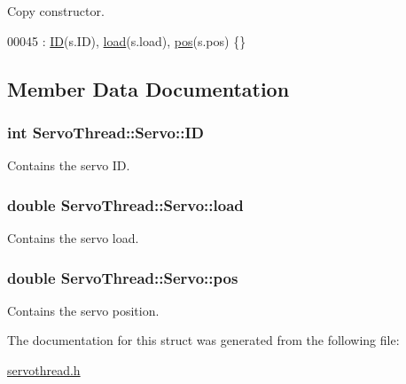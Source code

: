 Copy constructor. 


\begin{DoxyCode}
00045 : \hyperlink{struct_servo_thread_1_1_servo_a06b514c42113aa85fd1703fc88fca7ce}{ID}(s.ID), \hyperlink{struct_servo_thread_1_1_servo_ae378d77acf16b306649c87fdb8df677e}{load}(s.load), \hyperlink{struct_servo_thread_1_1_servo_a9fa0aa56944b9b0bb9d66303d5bd4b59}{pos}(s.pos) \{\}
\end{DoxyCode}


\subsection{Member Data Documentation}
\hypertarget{struct_servo_thread_1_1_servo_a06b514c42113aa85fd1703fc88fca7ce}{}
\subsubsection[{I\+D}]{\setlength{\rightskip}{0pt plus 5cm}int Servo\+Thread\+::\+Servo\+::\+I\+D}\label{struct_servo_thread_1_1_servo_a06b514c42113aa85fd1703fc88fca7ce}


Contains the servo I\+D. 

\hypertarget{struct_servo_thread_1_1_servo_ae378d77acf16b306649c87fdb8df677e}{}
\subsubsection[{load}]{\setlength{\rightskip}{0pt plus 5cm}double Servo\+Thread\+::\+Servo\+::load}\label{struct_servo_thread_1_1_servo_ae378d77acf16b306649c87fdb8df677e}


Contains the servo load. 

\hypertarget{struct_servo_thread_1_1_servo_a9fa0aa56944b9b0bb9d66303d5bd4b59}{}
\subsubsection[{pos}]{\setlength{\rightskip}{0pt plus 5cm}double Servo\+Thread\+::\+Servo\+::pos}\label{struct_servo_thread_1_1_servo_a9fa0aa56944b9b0bb9d66303d5bd4b59}


Contains the servo position. 



The documentation for this struct was generated from the following file\+:\begin{DoxyCompactItemize}
\item 
\hyperlink{servothread_8h}{servothread.\+h}\end{DoxyCompactItemize}
